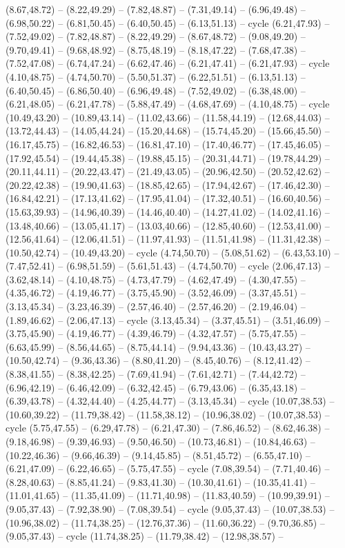 {(8.67,48.72) -- (8.22,49.29) -- (7.82,48.87) -- (7.31,49.14) -- (6.96,49.48) -- (6.98,50.22) -- (6.81,50.45) -- (6.40,50.45) -- (6.13,51.13) -- cycle (6.21,47.93) -- (7.52,49.02) -- (7.82,48.87) -- (8.22,49.29) -- (8.67,48.72) -- (9.08,49.20) -- (9.70,49.41) -- (9.68,48.92) -- (8.75,48.19) -- (8.18,47.22) -- (7.68,47.38) -- (7.52,47.08) -- (6.74,47.24) -- (6.62,47.46) -- (6.21,47.41) -- (6.21,47.93) -- cycle (4.10,48.75) -- (4.74,50.70) -- (5.50,51.37) -- (6.22,51.51) -- (6.13,51.13) -- (6.40,50.45) -- (6.86,50.40) -- (6.96,49.48) -- (7.52,49.02) -- (6.38,48.00) -- (6.21,48.05) -- (6.21,47.78) -- (5.88,47.49) -- (4.68,47.69) -- (4.10,48.75) -- cycle (10.49,43.20) -- (10.89,43.14) -- (11.02,43.66) -- (11.58,44.19) -- (12.68,44.03) -- (13.72,44.43) -- (14.05,44.24) -- (15.20,44.68) -- (15.74,45.20) -- (15.66,45.50) -- (16.17,45.75) -- (16.82,46.53) -- (16.81,47.10) -- (17.40,46.77) -- (17.45,46.05) -- (17.92,45.54) -- (19.44,45.38) -- (19.88,45.15) -- (20.31,44.71) -- (19.78,44.29) -- (20.11,44.11) -- (20.22,43.47) -- (21.49,43.05) -- (20.96,42.50) -- (20.52,42.62) -- (20.22,42.38) -- (19.90,41.63) -- (18.85,42.65) -- (17.94,42.67) -- (17.46,42.30) -- (16.84,42.21) -- (17.13,41.62) -- (17.95,41.04) -- (17.32,40.51) -- (16.60,40.56) -- (15.63,39.93) -- (14.96,40.39) -- (14.46,40.40) -- (14.27,41.02) -- (14.02,41.16) -- (13.48,40.66) -- (13.05,41.17) -- (13.03,40.66) -- (12.85,40.60) -- (12.53,41.00) -- (12.56,41.64) -- (12.06,41.51) -- (11.97,41.93) -- (11.51,41.98) -- (11.31,42.38) -- (10.50,42.74) -- (10.49,43.20) -- cycle (4.74,50.70) -- (5.08,51.62) -- (6.43,53.10) -- (7.47,52.41) -- (6.98,51.59) -- (5.61,51.43) -- (4.74,50.70) -- cycle (2.06,47.13) -- (3.62,48.14) -- (4.10,48.75) -- (4.73,47.79) -- (4.62,47.49) -- (4.30,47.55) -- (4.35,46.72) -- (4.19,46.77) -- (3.75,45.90) -- (3.52,46.09) -- (3.37,45.51) -- (3.13,45.34) -- (3.23,46.39) -- (2.57,46.40) -- (2.57,46.20) -- (2.19,46.04) -- (1.89,46.62) -- (2.06,47.13) -- cycle (3.13,45.34) -- (3.37,45.51) -- (3.51,46.09) -- (3.75,45.90) -- (4.19,46.77) -- (4.39,46.79) -- (4.32,47.57) -- (5.75,47.55) -- (6.63,45.99) -- (8.56,44.65) -- (8.75,44.14) -- (9.94,43.36) -- (10.43,43.27) -- (10.50,42.74) -- (9.36,43.36) -- (8.80,41.20) -- (8.45,40.76) -- (8.12,41.42) -- (8.38,41.55) -- (8.38,42.25) -- (7.69,41.94) -- (7.61,42.71) -- (7.44,42.72) -- (6.96,42.19) -- (6.46,42.09) -- (6.32,42.45) -- (6.79,43.06) -- (6.35,43.18) -- (6.39,43.78) -- (4.32,44.40) -- (4.25,44.77) -- (3.13,45.34) -- cycle (10.07,38.53) -- (10.60,39.22) -- (11.79,38.42) -- (11.58,38.12) -- (10.96,38.02) -- (10.07,38.53) -- cycle (5.75,47.55) -- (6.29,47.78) -- (6.21,47.30) -- (7.86,46.52) -- (8.62,46.38) -- (9.18,46.98) -- (9.39,46.93) -- (9.50,46.50) -- (10.73,46.81) -- (10.84,46.63) -- (10.22,46.36) -- (9.66,46.39) -- (9.14,45.85) -- (8.51,45.72) -- (6.55,47.10) -- (6.21,47.09) -- (6.22,46.65) -- (5.75,47.55) -- cycle (7.08,39.54) -- (7.71,40.46) -- (8.28,40.63) -- (8.85,41.24) -- (9.83,41.30) -- (10.30,41.61) -- (10.35,41.41) -- (11.01,41.65) -- (11.35,41.09) -- (11.71,40.98) -- (11.83,40.59) -- (10.99,39.91) -- (9.05,37.43) -- (7.92,38.90) -- (7.08,39.54) -- cycle (9.05,37.43) -- (10.07,38.53) -- (10.96,38.02) -- (11.74,38.25) -- (12.76,37.36) -- (11.60,36.22) -- (9.70,36.85) -- (9.05,37.43) -- cycle (11.74,38.25) -- (11.79,38.42) -- (12.98,38.57) -- }
